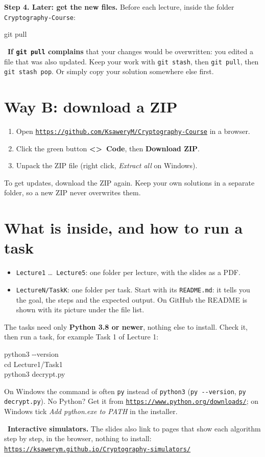 \documentclass[11pt,a4paper]{article}
\newcommand{\link}[1]{\href{#1}{\textcolor{link}{\texttt{#1}}}}
\begin{document}
\textbf{Step 4. Later: get the new files.} Before each lecture, inside the folder \texttt{Cryptography-Course}:
\begin{terminal}
git pull
\end{terminal}

\begin{tip}
\faLightbulb\ \textbf{If \texttt{git pull} complains} that your changes would be overwritten:
you edited a file that was also updated. Keep your work with \texttt{git stash}, then \texttt{git pull},
then \texttt{git stash pop}. Or simply copy your solution somewhere else first.
\end{tip}

\section{Way B: download a ZIP}

\begin{enumerate}[nosep, leftmargin=1.6em]
  \item Open \link{https://github.com/KsaweryM/Cryptography-Course} in a browser.
  \item Click the green button \textbf{\textless\textgreater\ Code}, then \textbf{Download ZIP}.
  \item Unpack the ZIP file (right click, \emph{Extract all} on Windows).
\end{enumerate}
To get updates, download the ZIP again. Keep your own solutions in a separate folder, so a new ZIP never overwrites them.

\section{What is inside, and how to run a task}

\begin{itemize}[nosep, leftmargin=1.4em]
  \item \texttt{Lecture1} \dots\ \texttt{Lecture5}: one folder per lecture, with the slides as a PDF.
  \item \texttt{LectureN/TaskK}: one folder per task. Start with its \texttt{README.md}: it tells you the goal,
        the steps and the expected output. On GitHub the README is shown with its picture under the file list.
\end{itemize}

The tasks need only \textbf{Python 3.8 or newer}, nothing else to install. Check it, then run a task, for example Task 1 of Lecture 1:
\begin{terminal}
python3 -{}-version\\
cd Lecture1/Task1\\
python3 decrypt.py
\end{terminal}
On Windows the command is often \texttt{py} instead of \texttt{python3} (\texttt{py -{}-version}, \texttt{py decrypt.py}).
No Python? Get it from \link{https://www.python.org/downloads/}; on Windows tick \emph{Add python.exe to PATH} in the installer.

\begin{tip}
\faDesktop\ \textbf{Interactive simulators.} The slides also link to pages that show each algorithm step by step,
in the browser, nothing to install: \link{https://ksawerym.github.io/Cryptography-simulators/}
\end{tip}
\end{document}
